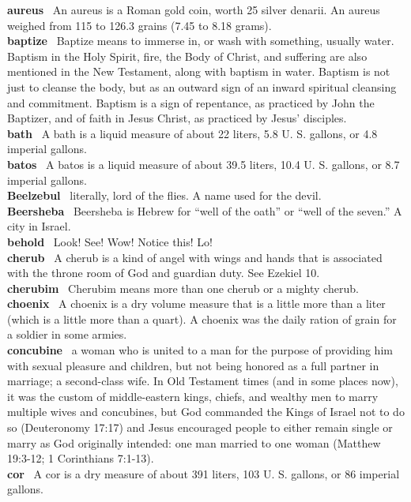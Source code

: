 \textbf{aureus}~ An aureus is a Roman gold coin, worth 25 silver
denarii. An aureus weighed from 115 to 126.3 grains (7.45 to 8.18
grams).\\
\textbf{baptize}~ Baptize means to immerse in, or wash with something,
usually water. Baptism in the Holy Spirit, fire, the Body of Christ, and
suffering are also mentioned in the New Testament, along with baptism in
water. Baptism is not just to cleanse the body, but as an outward sign
of an inward spiritual cleansing and commitment. Baptism is a sign of
repentance, as practiced by John the Baptizer, and of faith in Jesus
Christ, as practiced by Jesus' disciples.\\
\textbf{bath}~ A bath is a liquid measure of about 22 liters, 5.8 U. S.
gallons, or 4.8 imperial gallons.\\
\textbf{batos}~ A batos is a liquid measure of about 39.5 liters, 10.4
U. S. gallons, or 8.7 imperial gallons.\\
\textbf{Beelzebul}~ literally, lord of the flies. A name used for the
devil.\\
\textbf{Beersheba}~ Beersheba is Hebrew for ``well of the oath'' or
``well of the seven.'' A city in Israel.\\
\textbf{behold}~ Look! See! Wow! Notice this! Lo!\\
\textbf{cherub}~ A cherub is a kind of angel with wings and hands that
is associated with the throne room of God and guardian duty. See Ezekiel
10.\\
\textbf{cherubim}~ Cherubim means more than one cherub or a mighty
cherub.\\
\textbf{choenix}~ A choenix is a dry volume measure that is a little
more than a liter (which is a little more than a quart). A choenix was
the daily ration of grain for a soldier in some armies.\\
\textbf{concubine}~ a woman who is united to a man for the purpose of
providing him with sexual pleasure and children, but not being honored
as a full partner in marriage; a second-class wife. In Old Testament
times (and in some places now), it was the custom of middle-eastern
kings, chiefs, and wealthy men to marry multiple wives and concubines,
but God commanded the Kings of Israel not to do so (Deuteronomy 17:17)
and Jesus encouraged people to either remain single or marry as God
originally intended: one man married to one woman (Matthew 19:3-12; 1
Corinthians 7:1-13).\\
\textbf{cor}~ A cor is a dry measure of about 391 liters, 103 U. S.
gallons, or 86 imperial gallons.\\
